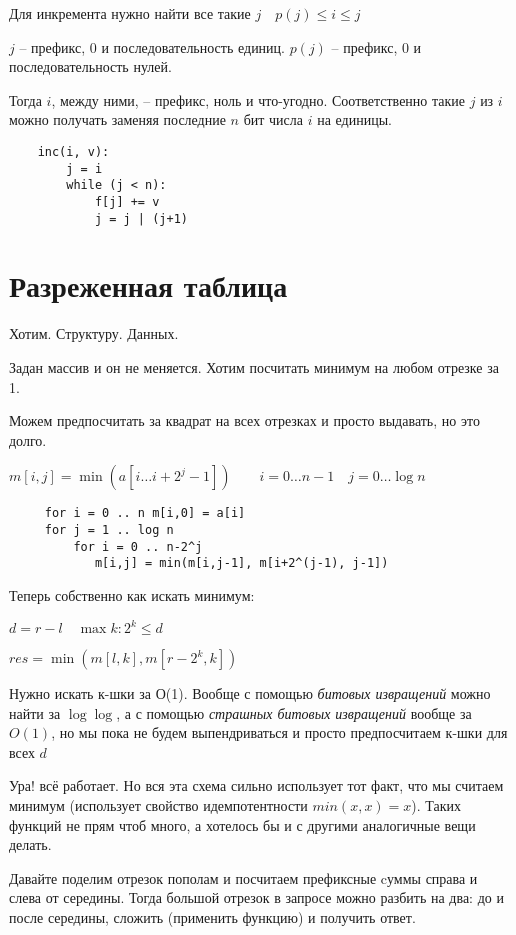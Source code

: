 \documentclass{book}
\theoremstyle{definition}
\begin{document}
Для инкремента нужно найти все такие $j\quad p(j)\leqslant i\leqslant j$

$j$ -- префикс, 0 и последовательность единиц.  $p(j)$ -- префикс, 0 и последовательность нулей.

Тогда  $i$, между ними, -- префикс, ноль и что-угодно. Соответственно такие $j$ из  $i$ можно получать заменяя последние  $n$ бит числа $i$ на единицы.

 \begin{verbatim}
    inc(i, v):
        j = i
        while (j < n):
            f[j] += v
            j = j | (j+1)

\end{verbatim}


\section{Разреженная таблица}

Хотим. Структуру. Данных.

Задан массив и он не меняется. Хотим посчитать минимум на любом отрезке за 1.

Можем предпосчитать за квадрат на всех отрезках и просто выдавать, но это долго.

$m[i,j] = \min\left( a\left[ i \ldots i+2^j-1 \right]  \right) \qquad i = 0 \ldots n-1\quad j = 0 \ldots \log n$

\begin{verbatim}
     for i = 0 .. n m[i,0] = a[i]
     for j = 1 .. log n
         for i = 0 .. n-2^j
            m[i,j] = min(m[i,j-1], m[i+2^(j-1), j-1])
\end{verbatim}

Теперь собственно как искать минимум:

$d = r-l\quad \max k: 2^k \leqslant  d$

$res = \min\left( m[l,k], m[r-2^k, k] \right) $ 

Нужно искать к-шки за О(1). Вообще с помощью \textit{битовых извращений} можно найти за $\log\log$, а с помощью \textit{страшных битовых извращений} вообще за  $O(1)$, но мы пока не будем выпендриваться  и просто предпосчитаем к-шки для всех  $d$

Ура! всё работает. Но вся эта схема сильно использует тот факт, что мы считаем минимум (использует свойство идемпотентности $min(x,x) = x$). Таких функций не прям чтоб много, а хотелось бы и с другими аналогичные вещи делать.

Давайте поделим отрезок пополам и посчитаем  префиксные cуммы справа и слева от середины. Тогда большой отрезок в запросе можно разбить на два:  до и после середины, сложить (применить функцию) и получить ответ.
\end{document}
